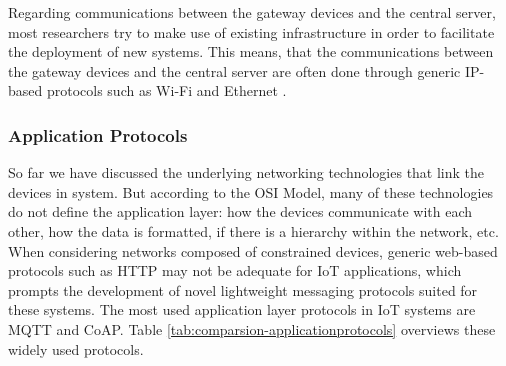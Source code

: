 Regarding communications between the gateway devices and the central server, most researchers try to make use of existing infrastructure in order to facilitate the deployment of new systems. This means, that the communications between the gateway devices and the central server are often done through generic IP-based protocols such as Wi-Fi and Ethernet \cite{Adame2018, Fuhrer2006, Wu2020, Catarinucci2015}. \bigskip

\subsubsection{Application Protocols}

So far we have discussed the underlying networking technologies that link the devices in system. But according to the OSI Model, many of these technologies do not define the application layer: how the devices communicate with each other, how the data is formatted, if there is a hierarchy within the network, etc. When considering networks composed of constrained devices, generic web-based protocols such as \acf{HTTP} may not be adequate for \acs{IoT} applications, which prompts the development of novel lightweight messaging protocols suited for these systems. The most used application layer protocols in \acs{IoT} systems are \acf{MQTT} and \acf{CoAP}. Table \ref{tab:comparsion-applicationprotocols} overviews these widely used protocols. \bigskip

